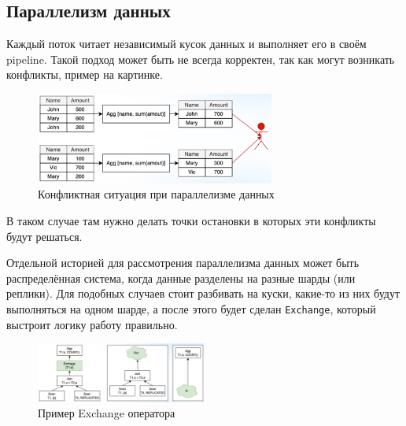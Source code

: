 \documentclass[11pt]{article}
\begin{document}
    \subsection{Параллелизм данных}

    Каждый поток читает независимый кусок данных и выполняет его в своём pipeline.
    Такой подход может быть не всегда корректен, так как могут возникать конфликты, пример на картинке.
    
    \begin{figure}[h!]
        \centering
        \includegraphics[width=0.7\textwidth]{Pictures/Push/Parallelism/Data/Conflict}
        \caption{Конфликтная ситуация при параллелизме данных}
    \end{figure}

    В таком случае там нужно делать точки остановки в которых эти конфликты будут решаться.

    Отдельной историей для рассмотрения параллелизма данных может быть распределённая система, когда данные разделены на разные шарды (или реплики).
    Для подобных случаев стоит разбивать на куски, какие-то из них будут выполняться на одном шарде, а после этого будет сделан \texttt{Exchange}, который выстроит логику работу правильно.
    
    \begin{figure}[h!]
        \centering
        \includegraphics[width=0.5\textwidth]{Pictures/Push/Parallelism/Data/Exchange}
        \caption{Пример Exchange оператора}
    \end{figure}
    
\end{document}

